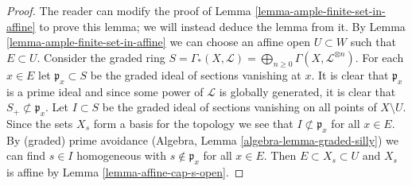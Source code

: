 \begin{proof}
The reader can modify the proof of Lemma \ref{lemma-ample-finite-set-in-affine}
to prove this lemma; we will instead deduce the lemma from it.
By Lemma \ref{lemma-ample-finite-set-in-affine} we can choose an affine
open $U \subset W$ such that $E \subset U$.
Consider the graded ring $S = \Gamma_*(X, \mathcal{L}) =
\bigoplus_{n \geq 0} \Gamma(X, \mathcal{L}^{\otimes n})$.
For each $x \in E$ let $\mathfrak p_x \subset S$ be the graded ideal
of sections vanishing at $x$. It is clear that $\mathfrak p_x$ is
a prime ideal and since some power of $\mathcal{L}$ is globally
generated, it is clear that $S_{+} \not \subset \mathfrak p_x$.
Let $I \subset S$ be the graded ideal of sections vanishing on all
points of $X \setminus U$. Since the sets $X_s$ form a basis
for the topology we see that $I \not \subset \mathfrak p_x$ for
all $x \in E$.
By (graded) prime avoidance (Algebra, Lemma \ref{algebra-lemma-graded-silly})
we can find $s \in I$ homogeneous
with $s \not \in \mathfrak p_x$ for all $x \in E$.
Then $E \subset X_s \subset U$ and $X_s$ is affine by
Lemma \ref{lemma-affine-cap-s-open}.
\end{proof}

















